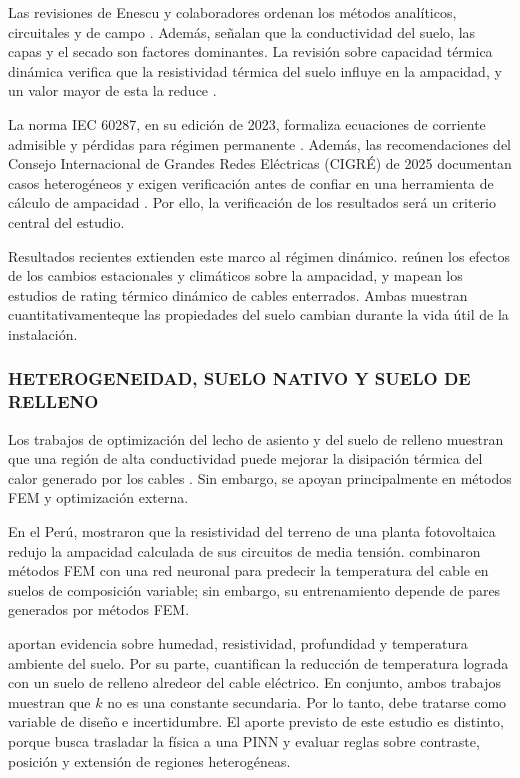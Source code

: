 Las revisiones de Enescu y colaboradores ordenan los métodos analíticos, circuitales y de campo \parencite[4,11,17]{enescu2020}. Además, señalan que la conductividad del suelo, las capas y el secado son factores dominantes. La revisión sobre capacidad térmica dinámica verifica  que la resistividad térmica del suelo influye en la ampacidad, y un valor mayor de esta la reduce \parencite[3--6]{enescu2021}.

La norma IEC 60287, en su edición de 2023, formaliza ecuaciones de corriente admisible y pérdidas para régimen permanente \parencite[cláusulas 4--5]{iec60287}. Además, las recomendaciones del Consejo Internacional de Grandes Redes Eléctricas (CIGRÉ) de 2025 documentan casos heterogéneos y exigen verificación antes de confiar en una herramienta de cálculo de ampacidad \parencite[3--4,41--42,93--99]{cigre2025}. Por ello, la verificación de los resultados será un criterio central del estudio.

Resultados recientes extienden este marco al régimen dinámico. \textcite{mobius2025} reúnen los efectos de los cambios estacionales y climáticos sobre la ampacidad, y \textcite{fariz2026} mapean los estudios de rating térmico dinámico de cables enterrados. Ambas muestran cuantitativamenteque las propiedades del suelo cambian durante la vida útil de la instalación.

\subsubsection{HETEROGENEIDAD, SUELO NATIVO Y SUELO DE RELLENO}

Los trabajos de optimización del lecho de asiento y del suelo de relleno muestran que una región de alta conductividad puede mejorar la disipación térmica del calor generado por los cables \parencites[1--3]{oclon2015}[1--4]{atoccsa2024}. Sin embargo, se apoyan principalmente en métodos FEM y optimización externa.

En el Perú, \textcite[7--8]{ariasVelasquez2023} mostraron que la resistividad del terreno de una planta fotovoltaica redujo la ampacidad calculada de sus circuitos de media tensión. \textcite[1--3,12]{aldulaimi2024} combinaron métodos FEM con una red neuronal para predecir la temperatura del cable en suelos de composición variable; sin embargo, su entrenamiento depende de pares generados por métodos FEM.

\textcite[1,6--9]{khumalo2025} aportan evidencia sobre humedad, resistividad, profundidad y temperatura ambiente del suelo. Por su parte, \textcite[1,10,16]{kim2025} cuantifican la reducción de temperatura lograda con un suelo de relleno alredeor del cable eléctrico. En conjunto, ambos trabajos muestran que $k$ no es una constante secundaria. Por lo tanto, debe tratarse como variable de diseño e incertidumbre. El aporte previsto de este estudio es distinto, porque busca trasladar la física a una PINN y evaluar reglas sobre contraste, posición y extensión de regiones heterogéneas.

